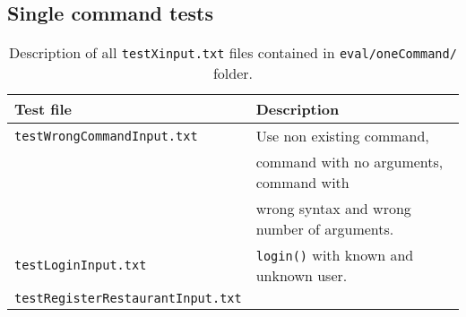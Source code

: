 \subsection{Single command tests} %
\label{sub:single_command_tests}

\begin{table}[h]
  \begin{center}
    \begin{tabular}{|l|l|}
      \hline
      \textbf{Test file} & \textbf{Description}\\
      \hline
        \lstinline|testWrongCommandInput.txt|
        & Use non existing command,\\
        & command with no arguments, command with \\
        & wrong syntax and wrong number of arguments.  \\
        
        \lstinline|testLoginInput.txt|
        & \lstinline|login()| with known and unknown user. \\
        
        \lstinline|testRegisterRestaurantInput.txt|
        & \\
      \hline
    \end{tabular}
  \end{center}
  \caption{Description of all \lstinline|testXinput.txt| files contained
  in \texttt{eval/oneCommand/} folder.}
  \label{tab:clui_test}
\end{table}

